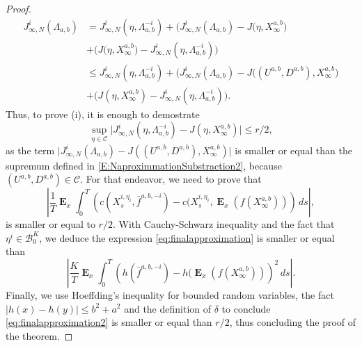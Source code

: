 \documentclass[10pt,a4paper]{amsart}
\newcommand\E{\operatorname{\mathbf{E}}}
\begin{document}
\begin{proof}
\begin{align}
J_{\infty,N}^{i}( \Lambda_{a,b})&=  J_{\infty,N}^{i}(\eta,\Lambda^{-i}_{a,b})+\big(J_{\infty,N}^{i}(\Lambda_{a,b})-J(\eta,X^{a,b}_{\infty}\big) \nonumber
\\& +\big(J(\eta,X^{a,b}_{\infty}\big)-J_{\infty,N}^{i}(\eta,\Lambda^{-i}_{a,b}) \big)\nonumber \\
                &\leq J_{\infty,N}^i(\eta,\Lambda^{-i}_{a,b})+\big(J_{\infty,N}^{i}(\Lambda_{a,b})-J((U^{a,b},D^{a,b}),X^{a,b}_{\infty}\big)\nonumber\\&+\big(J(\eta,X^{a,b}_{\infty} )-J_{\infty,N}^{i}(\eta,\Lambda^{-i}_{a,b}) \big).  \nonumber
\end{align}
%
Thus, to prove (\rm{i}), it is enough to demostrate 
 \begin{equation}\label{E:NaproximmationSubstraction2}
\sup_{\eta\in\mathcal{C}}\vert  J_{\infty,N}^{i}(\eta, \Lambda^{-i}_{a,b})-J(\eta, X^{a,b}_{\infty})\vert  \leq r/2,
\end{equation}
as the term $\vert J_{\infty,N}^{i} (\Lambda_{a,b})- J((U^{a,b},D^{a,b}),X^{a,b}_{\infty}) \vert$ is smaller or equal than the supremum defined in \eqref{E:NaproximmationSubstraction2}, because $(U^{a,b},D^{a,b}) \in \mathcal{C}$. For that endeavor, we need to prove that
\begin{equation}\label{eq:finalapproximation}
\left|\frac1T\E_x\int_0^T\left(c(X^{i,\eta_i}_s,\bar f^{a,b,-i})-c(X^{i,\eta_i}_s,\E_x(f(X^{a,b}_{\infty}))\right)\,ds\right|,
\end{equation}
is smaller or equal to $r/2$.
With Cauchy-Schwarz inequality and the fact that $\eta^i \in \mathcal{B}_0^K$, we deduce the expression \eqref{eq:finalapproximation} is smaller or equal than 
\begin{equation}\label{eq:finalapproximation2}
\left|\frac{K}{T}\E_x\int_0^T\left(h(\bar f^{a,b,-i})-h(\E_x(f(X^{a,b}_{\infty}))\right)^2\,ds\right|.
\end{equation}
Finally, we use Hoeffding's inequality for bounded random variables, the fact $\vert h(x)-h(y)\vert \leq b^2+a^2$ and the definition of $\delta$ to conclude \eqref{eq:finalapproximation2} is smaller or equal than $r/2$, thus concluding the proof of the theorem.

\end{proof}
\end{document}

